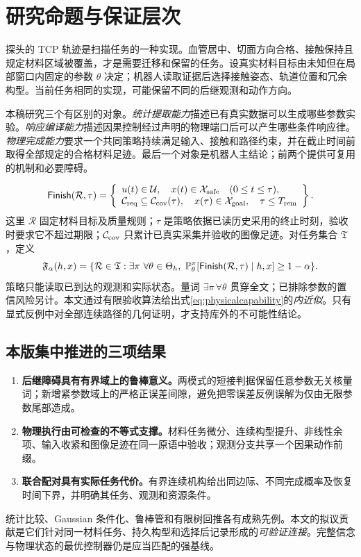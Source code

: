 \documentclass[UTF8,fontset=fandol,zihao=5,a4paper]{ctexart}
\theoremstyle{definition}
\theoremstyle{remark}\newtheorem{remark}[theorem]{说明}
\numberwithin{equation}{section}
\begin{document}
\section{研究命题与保证层次}
\label{sec:problem}
探头的 TCP 轨迹是扫描任务的一种实现。血管居中、切面方向合格、接触保持且规定材料区域被覆盖，才是需要迁移和保留的任务。设真实材料目标由未知但在局部窗口内固定的参数 $\theta$ 决定；机器人读取证据后选择接触姿态、轨道位置和冗余构型。当前任务相同的实现，可能保留不同的后继观测和动作方向。

本稿研究三个有区别的对象。\emph{统计提取能力}描述已有真实数据可以生成哪些参数实验。\emph{响应编译能力}描述因果控制经过声明的物理端口后可以产生哪些条件响应律。\emph{物理完成能力}要求一个共同策略持续满足输入、接触和路径约束，并在截止时间前取得全部规定的合格材料足迹。最后一个对象是机器人主结论；前两个提供可复用的机制和必要障碍。

\begin{equation}
\mathsf{Finish}(\mathcal R,\tau)=
\left\{\begin{array}{l}
u(t)\in\mathcal U,\quad x(t)\in\mathcal X_{\rm safe}\quad(0\le t\le\tau),\\
\mathcal C_{\rm req}\subseteq\mathcal C_{\rm cov}(\tau),\quad
x(\tau)\in\mathcal X_{\rm goal},\quad\tau\le T_{\rm rem}
\end{array}\right\}.
\label{eq:finish}
\end{equation}
这里 $\mathcal R$ 固定材料目标及质量规则；$\tau$ 是策略依据已读历史采用的终止时刻，验收时要求它不超过期限；$\mathcal C_{\rm cov}$ 只累计已真实采集并验收的图像足迹。对任务集合 $\mathfrak T$，定义
\begin{equation}
\mathfrak F_{\alpha}(h,x)=
\{\mathcal R\in\mathfrak T:\exists\pi\ \forall\theta\in\Theta_h,
\ \mathbb P_\theta^\pi[\mathsf{Finish}(\mathcal R,\tau)\mid h,x]\ge1-\alpha\}.
\label{eq:physicalcapability}
\end{equation}
策略只能读取已到达的观测和实际状态。量词 $\exists\pi\,\forall\theta$ 贯穿全文；已排除参数的置信风险另计。本文通过有限验收算法给出式\eqref{eq:physicalcapability}的\emph{内近似}。只有显式反例中对全部连续路径的几何证明，才支持库外的不可能性结论。

\subsection{本版集中推进的三项结果}
\begin{enumerate}
\item \textbf{后继障碍具有有界域上的鲁棒意义。}两模式的短接判据保留任意参数无关核量词；新增紧参数域上的严格正误差间隙，避免把零误差反例误解为仅由无限参数尾部造成。
\item \textbf{物理执行由可检查的不等式支撑。}材料任务微分、连续构型提升、非线性余项、输入收紧和图像足迹在同一原语中验收；观测分支共享一个因果动作前缀。
\item \textbf{联合配对具有实际任务代价。}有界连续机构给出同边际、不同完成概率及恢复时间下界，并明确其任务、观测和资源条件。
\end{enumerate}
统计比较、Gaussian 条件化、鲁棒管和有限树回推各有成熟先例\cite{xiao,selectionkalman,frr,funnels}。本文的拟议贡献是它们针对同一材料任务、持久构型和选择后记录形成的\emph{可验证连接}。完整信念与物理状态的最优控制器仍是应当匹配的强基线。
\end{document}
